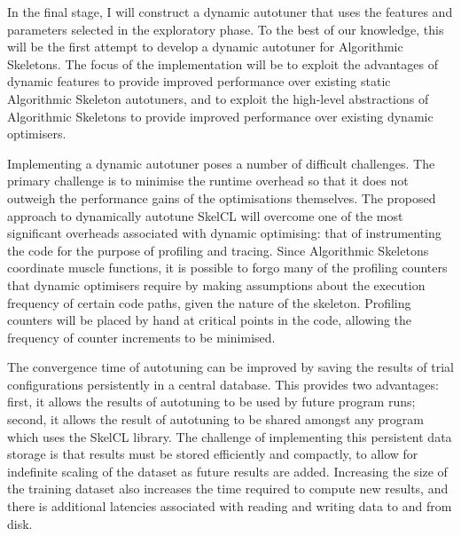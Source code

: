 
In the final stage, I will construct a dynamic autotuner that uses the
features and parameters selected in the exploratory phase. To the best
of our knowledge, this will be the first attempt to develop a dynamic
autotuner for Algorithmic Skeletons. The focus of the implementation
will be to exploit the advantages of dynamic features to provide
improved performance over existing static Algorithmic Skeleton
autotuners, and to exploit the high-level abstractions of Algorithmic
Skeletons to provide improved performance over existing dynamic
optimisers.

Implementing a dynamic autotuner poses a number of difficult
challenges. The primary challenge is to minimise the runtime overhead
so that it does not outweigh the performance gains of the
optimisations themselves. The proposed approach to dynamically
autotune SkelCL will overcome one of the most significant overheads
associated with dynamic optimising: that of instrumenting the code for
the purpose of profiling and tracing. Since Algorithmic Skeletons
coordinate muscle functions, it is possible to forgo many of the
profiling counters that dynamic optimisers require by making
assumptions about the execution frequency of certain code paths, given
the nature of the skeleton. Profiling counters will be placed by hand
at critical points in the code, allowing the frequency of counter
increments to be minimised.

The convergence time of autotuning can be improved by saving the
results of trial configurations persistently in a central
database. This provides two advantages: first, it allows the results
of autotuning to be used by future program runs; second, it allows the
result of autotuning to be shared amongst any program which uses the
SkelCL library. The challenge of implementing this persistent data
storage is that results must be stored efficiently and compactly, to
allow for indefinite scaling of the dataset as future results are
added. Increasing the size of the training dataset also increases the
time required to compute new results, and there is additional
latencies associated with reading and writing data to and from disk.
